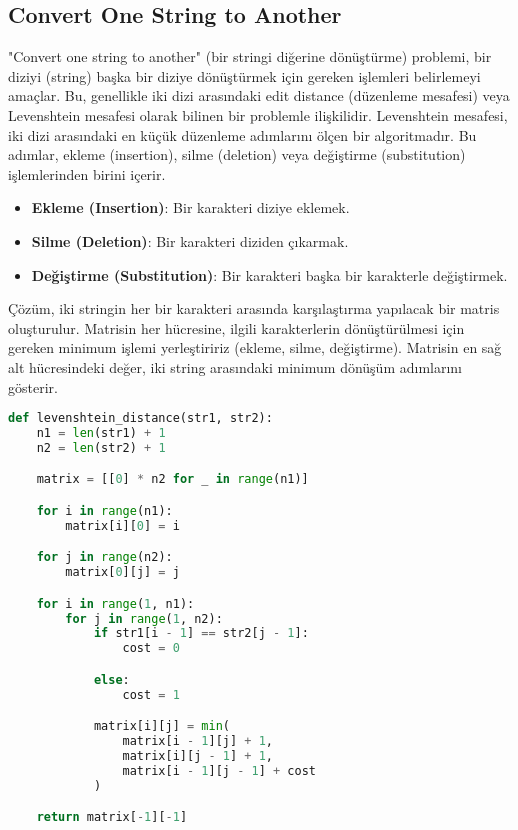 \newpage

\subsection{Convert One String to Another}

"Convert one string to another" (bir stringi diğerine dönüştürme) problemi, bir diziyi (string) başka bir diziye dönüştürmek için gereken işlemleri belirlemeyi amaçlar. Bu, genellikle iki dizi arasındaki edit distance (düzenleme mesafesi) veya Levenshtein mesafesi olarak bilinen bir problemle ilişkilidir. Levenshtein mesafesi, iki dizi arasındaki en küçük düzenleme adımlarını ölçen bir algoritmadır. Bu adımlar, ekleme (insertion), silme (deletion) veya değiştirme (substitution) işlemlerinden birini içerir.

\begin{itemize}
    \item \textbf{Ekleme (Insertion)}: Bir karakteri diziye eklemek.
    \item \textbf{Silme (Deletion)}: Bir karakteri diziden çıkarmak.
    \item \textbf{Değiştirme (Substitution)}: Bir karakteri başka bir karakterle değiştirmek.
\end{itemize}

Çözüm, iki stringin her bir karakteri arasında karşılaştırma yapılacak bir matris oluşturulur. Matrisin her hücresine, ilgili karakterlerin dönüştürülmesi için gereken minimum işlemi yerleştiririz (ekleme, silme, değiştirme). Matrisin en sağ alt hücresindeki değer, iki string arasındaki minimum dönüşüm adımlarını gösterir.

\begin{lstlisting}[language=Python]
def levenshtein_distance(str1, str2):
    n1 = len(str1) + 1
    n2 = len(str2) + 1

    matrix = [[0] * n2 for _ in range(n1)]

    for i in range(n1):
        matrix[i][0] = i

    for j in range(n2):
        matrix[0][j] = j

    for i in range(1, n1):
        for j in range(1, n2):
            if str1[i - 1] == str2[j - 1]:
                cost = 0

            else:
                cost = 1

            matrix[i][j] = min(
                matrix[i - 1][j] + 1,
                matrix[i][j - 1] + 1,
                matrix[i - 1][j - 1] + cost
            )

    return matrix[-1][-1]
\end{lstlisting}

